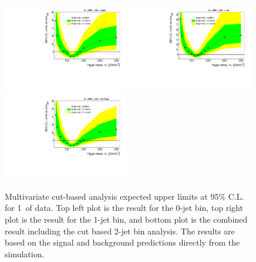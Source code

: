 \begin{figure}[!htbp]
\begin{center}
   \includegraphics[width=0.49\textwidth]{figures/limits_0j_1000pb_mva_1.pdf}
   \includegraphics[width=0.49\textwidth]{figures/limits_1j_1000pb_mva_1.pdf}
   \includegraphics[width=0.49\textwidth]{figures/limits_nj_1000pb_mva_1.pdf}
   \caption{Multivariate cut-based analysis expected upper limits at 95\% C.L. for 1\ifb\ of data. Top left plot 
   is the result for the 0-jet bin, top right plot is the result for the 1-jet bin, and 
   bottom plot is the combined result including the cut based 2-jet bin analysis. The results 
   are based on the signal and background predictions directly from the simulation.}
   \label{fig:mvabase_uls}
\end{center}
\end{figure}

